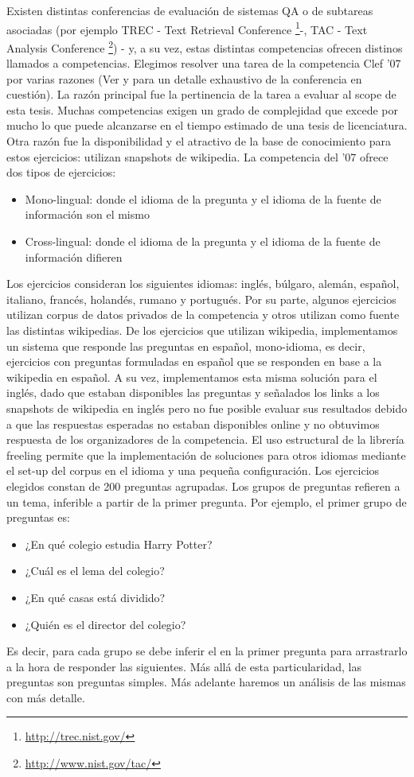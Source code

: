 Existen distintas conferencias de evaluación de sistemas QA o de subtareas asociadas (por ejemplo TREC - Text Retrieval Conference \footnote{\url{http://trec.nist.gov/}}-, TAC - Text Analysis Conference \footnote{\url{http://www.nist.gov/tac/}}) - y, a su vez, estas distintas competencias ofrecen distinos llamados a competencias. Elegimos resolver una tarea de la competencia Clef '07  por varias razones (Ver \cite{GuidelineClef07} y \cite{OverviewClef07} para un detalle exhaustivo de la conferencia en cuestión). La razón principal fue la pertinencia de la tarea a evaluar al scope de esta tesis. Muchas competencias exigen un grado de complejidad que excede por mucho lo que puede alcanzarse en el tiempo estimado de una tesis de licenciatura. 
Otra razón fue la disponibilidad y el atractivo de la base de conocimiento para estos ejercicios: utilizan snapshots de wikipedia. 
La competencia del '07 ofrece dos tipos de ejercicios:
\begin{itemize}
\item Mono-lingual: donde el idioma de la pregunta y el idioma de la fuente de información son el mismo
\item Cross-lingual: donde el idioma de la pregunta y el idioma de la fuente de información difieren
\end{itemize}
Los ejercicios consideran los siguientes idiomas: inglés, búlgaro, alemán, español, italiano, francés, holandés, rumano y portugués. Por su parte, algunos
ejercicios utilizan corpus de datos privados de la competencia y otros utilizan como fuente las distintas wikipedias. De los ejercicios que utilizan
wikipedia, implementamos un sistema que responde las preguntas en español, mono-idioma, es decir, ejercicios con preguntas formuladas en español que se responden en base a la wikipedia en español. A su vez, implementamos esta misma solución para el inglés, dado que estaban disponibles las preguntas y señalados los links a los snapshots de wikipedia en inglés pero no fue posible evaluar sus resultados debido a que las respuestas esperadas no estaban disponibles online y no obtuvimos respuesta de los organizadores de la competencia. El uso estructural de la librería freeling permite que la implementación de soluciones para otros idiomas mediante el set-up del corpus en el idioma y una pequeña configuración. 
Los ejercicios elegidos constan de 200 preguntas agrupadas. Los grupos de preguntas refieren a un tema, inferible a partir de la primer pregunta.
Por ejemplo, el primer grupo de preguntas es:
\begin{itemize}
\item ¿En qué colegio estudia Harry Potter?
\item ¿Cuál es el lema del colegio?
\item ¿En qué casas está dividido?
\item ¿Quién es el director del colegio?
\end{itemize}
Es decir, para cada grupo se debe inferir el  en la primer pregunta para arrastrarlo a la hora de responder las siguientes. Más allá de esta particularidad,
las preguntas son preguntas simples. Más adelante haremos un análisis de las mismas con más detalle.

